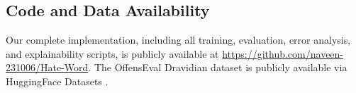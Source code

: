 \documentclass[12pt, a4paper]{article}
\begin{document}
\subsection{Code and Data Availability}

Our complete implementation, including all training, evaluation, error analysis, and explainability scripts, is publicly available at \url{https://github.com/naveen-231006/Hate-Word}. The OffensEval Dravidian dataset is publicly available via HuggingFace Datasets \citep{chakravarthi2021dataset}.

\FloatBarrier



\end{document}
